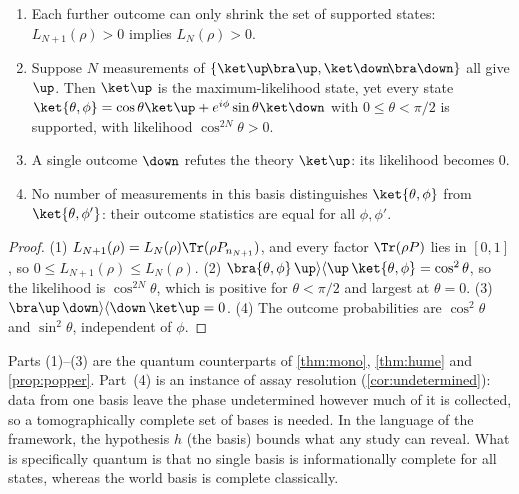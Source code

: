 \begin{proposition}\label{prop:qhume}
\leavevmode
\begin{enumerate}
  \item Each further outcome can only shrink the set of supported states:
        $L_{N+1}(\rho)>0$ implies $L_N(\rho)>0$.
  \item Suppose $N$ measurements of $\{\ket\up\!\bra\up,\ket\down\!\bra\down\}$ all give $\up$.
        Then $\ket\up$ is the maximum-likelihood state, yet every state
        $\ket{\theta,\phi}=\cos\theta\ket\up+e^{i\phi}\sin\theta\ket\down$ with $0\le\theta<\pi/2$
        is supported, with likelihood $\cos^{2N}\theta>0$.
  \item A single outcome $\down$ refutes the theory $\ket\up$: its likelihood becomes $0$.
  \item No number of measurements in this basis distinguishes $\ket{\theta,\phi}$ from
        $\ket{\theta,\phi'}$: their outcome statistics are equal for all $\phi,\phi'$.
\end{enumerate}
\end{proposition}

\begin{proof}
(1) $L_{N+1}(\rho)=L_N(\rho)\Tr(\rho P_{n_{N+1}})$, and every factor $\Tr(\rho P)$ lies in
$[0,1]$, so $0\le L_{N+1}(\rho)\le L_N(\rho)$.
(2) $\bra{\theta,\phi}\,\up\rangle\langle\up\,\ket{\theta,\phi}=\cos^2\theta$, so the likelihood is
$\cos^{2N}\theta$, which is positive for $\theta<\pi/2$ and largest at $\theta=0$.
(3) $\bra\up\,\down\rangle\langle\down\,\ket\up=0$.
(4) The outcome probabilities are $\cos^2\theta$ and $\sin^2\theta$, independent of $\phi$.
\end{proof}

Parts (1)--(3) are the quantum counterparts of \cref{thm:mono}, \cref{thm:hume} and
\cref{prop:popper}. Part~(4) is an instance of assay resolution (\cref{cor:undetermined}): data
from one basis leave the phase undetermined however much of it is collected, so a tomographically
complete set of bases is needed. In the language of the framework, the hypothesis $h$ (the basis)
bounds what any study can reveal. What is specifically quantum is that no single basis is
informationally complete for all states, whereas the world basis is complete classically.

